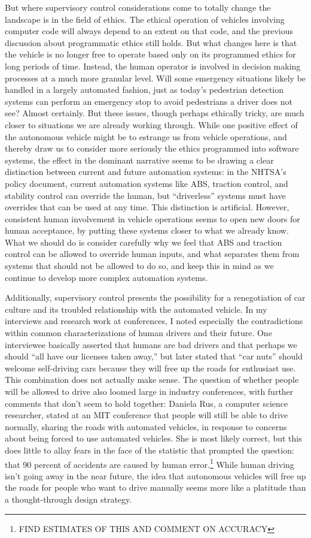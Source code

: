 But where supervisory control considerations come to totally change
the landscape is in the field of ethics. The ethical operation of
vehicles involving computer code will always depend to an extent on
that code, and the previous discussion about programmatic ethics still
holds. But what changes here is that the vehicle is no longer free to
operate based only on its programmed ethics for long periods of time.
Instead, the human operator is involved in decision making processes
at a much more granular level. Will some emergency situations likely
be handled in a largely automated fashion, just as today's pedestrian
detection systems can perform an emergency stop to avoid pedestrians a
driver does not see? Almost certainly. But these issues, though
perhaps ethically tricky, are much closer to situations we are already
working through. While one positive effect of the autonomous vehicle
might be to estrange us from vehicle operations, and thereby draw us
to consider more seriously the ethics programmed into software
systems, the effect in the dominant narrative seems to be drawing a
clear distinction between current and future automation systems:  in
the NHTSA's policy document, current automation systems like ABS,
traction control, and stability control can override the human, but
``driverless'' systems must have overrides that can be used at any
time\cite[p. ??]{NHTSA}. This distinction is artificial. However,
consistent human involvement in vehicle operations seems to open new
doors for human acceptance, by putting these systems closer to what we
already know. What we should do is consider carefully why we feel that
ABS and traction control can be allowed to override human inputs, and
what separates them from systems that should not be allowed to do so, and
keep this in mind as we continue to develop more complex automation systems.

Additionally, supervisory control presents the possibility for a renegotiation of car
culture and its troubled relationship with the automated vehicle. In
my interviews and research work at conferences, I noted especially the
contradictions within common characterizations of human
drivers and their future. One interviewee basically asserted that
humans are bad drivers and that perhaps we should ``all have our
licenses taken away,'' but later stated that ``car nuts'' should
welcome self-driving cars because they will free up the roads for
enthusiast use. This combination does not actually make sense. The
question of whether people will be allowed to drive also loomed large
in industry conferences, with further comments that don't seem to hold
together: Daniela Rus, a computer science researcher, stated at an MIT
conference that people will still be able to drive normally, sharing
the roads with automated vehicles, in response to concerns about being
forced to use automated vehicles. She is most likely correct, but this
does little to allay fears in the face of the statistic that prompted
the question: that 90 percent of accidents are caused by human
error.\footnote{FIND ESTIMATES OF THIS AND COMMENT ON ACCURACY} While
human driving isn't going away in the near future, the idea that
autonomous vehicles will free up the roads for people who want to
drive manually seems more like a platitude than a thought-through
design strategy. 

